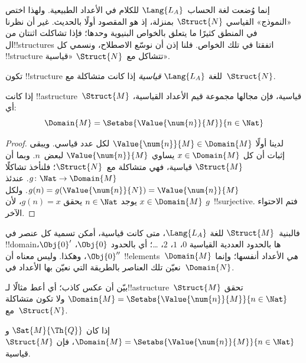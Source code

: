 \documentclass[../../../include/open-logic-section]{subfiles}
\begin{document}

إنما وُضعت لغة الحساب~$\Lang{L_A}$ للكلام في الأعداد الطبيعية.
ولهذا اختص «النموذج» القياسي $\Struct{N}$ بمنزلة، إذ هو المقصود
أولًا بالحديث. غير أن نظرنا في المنطق كثيرًا ما يتعلق بالخواص
البنيوية وحدها؛ فإذا تشاكلت اثنتان من ال!!{structure}s
اتفقتا في تلك الخواص. فلنا إذن أن نوسّع الاصطلاح، ونسمي كل !!{structure} تتشاكل
مع~$\Struct{N}$ «قياسية».

\begin{defn}
تكون !!{structure} للغة $\Lang{L_A}$ \emph{قياسية} إذا كانت متشاكلة
مع~$\Struct{N}$.
\end{defn}

\begin{prop}
 إذا كانت !!a{structure}~$\Struct{M}$
قياسية، فإن مجالها مجموعة قيم الأعداد القياسية، أي:
\[
\Domain{M} = \Setabs{\Value{\num{n}}{M}}{n \in \Nat}
\]
\end{prop}

\begin{proof}
لدينا أولًا $\Value{\num{n}}{M} \in \Domain{M}$ لكل عدد قياسي.
ويبقى إثبات أن كل $x \in \Domain{M}$ يساوي $\Value{\num{n}}{M}$
لبعض~$n$. وبما أن $\Struct{M}$ قياسية، فهي متشاكلة مع~$\Struct{N}$؛
فلنأخذ تشاكلًا $g\colon \Nat \to \Domain{M}$. عندئذ
$g(n) = g(\Value{\num{n}}{N}) = \Value{\num{n}}{M}$.
ولكل $x \in \Domain{M}$ يوجد $n \in \Nat$ يحقق $g(n)=x$،
لأن $g$~!!{surjective}. فتم الاحتواء الآخر.
\end{proof}

\begin{explain}
فالبنية~$\Struct{M}$ للغة $\Lang{L_A}$، متى كانت قياسية،
أمكن تسمية كل عنصر في !!{domain}ها بالحدود العددية القياسية
$\num{0}$، $\num{1}$، $\num{2}$، \dots؛ أي بالحدود
$\Obj{0}$، $\Obj{0}'$، $\Obj{0}''$، وهكذا. وليس معناه أن
!!{element}s~$\Domain{M}$ \emph{هي} الأعداد أنفسها؛ وإنما نعيّن
تلك العناصر بالطريقة التي نعيّن بها الأعداد في~$\Domain{N}$.
\end{explain}

\begin{prob}
بيّن أن عكس  كاذب؛ أي أعط
مثالًا لـ!!a{structure}~$\Struct{M}$ تحقق
$\Domain{M} = \Setabs{\Value{\num{n}}{M}}{n \in \Nat}$ ولا تكون
متشاكلة مع~$\Struct{N}$.
\end{prob}

\begin{prop}
إذا كان $\Sat{M}{\Th{Q}}$ و
$\Domain{M} = \Setabs{\Value{\num{n}}{M}}{n \in \Nat}$، فإن
$\Struct{M}$ قياسية.
\end{prop}
\end{document}
